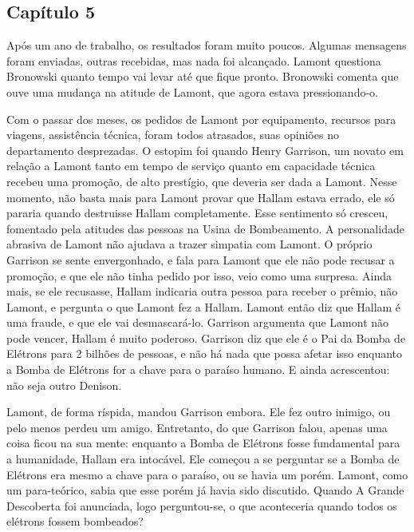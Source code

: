 \documentclass[14pt,portuguese]{extreport}
\begin{document}
	\subsection{Capítulo 5}

	  Após um ano de trabalho, os resultados foram muito poucos. Algumas mensagens foram enviadas, 
	  outras recebidas, mas nada foi alcançado. Lamont questiona Bronowski quanto tempo vai levar 
	  até que fique pronto. Bronowski comenta que ouve uma mudança na atitude de Lamont, que agora 
	  estava pressionando-o.
	
	  Com o passar dos meses, os pedidos de Lamont por equipamento, recursos para viagens, 
	  assistência técnica, foram todos atrasados, suas opiniões no departamento desprezadas. 
	  O estopim foi quando Henry Garrison, um novato em relação a Lamont tanto em tempo de serviço 
	  quanto em capacidade técnica recebeu uma promoção, de alto prestígio, que deveria ser dada a 
	  Lamont. Nesse momento, não basta mais para Lamont provar que Hallam estava errado, ele só 
	  pararia quando destruisse Hallam completamente. Esse sentimento só cresceu, fomentado pela 
	  atitudes das pessoas na Usina de Bombeamento. A personalidade abrasiva de Lamont não ajudava 
	  a trazer simpatia com Lamont. O próprio Garrison se sente envergonhado, e fala para Lamont 
	  que ele não pode recusar a promoção, e que ele não tinha pedido por isso, veio como uma 
	  surpresa. Ainda mais, se ele recusasse, Hallam indicaria outra pessoa para receber o prêmio, 
	  não Lamont, e pergunta o que Lamont fez a Hallam. Lamont então diz que Hallam é uma fraude, 
	  e que ele vai desmascará-lo. Garrison argumenta que Lamont não pode vencer, Hallam é muito 
	  poderoso. Garrison diz que ele é o Pai da Bomba de Elétrons para 2 bilhões de pessoas, e 
	  não há nada que possa afetar isso enquanto a Bomba de Elétrons for a chave para o paraíso 
	  humano. E ainda acrescentou: não seja outro Denison.
	  
	  Lamont, de forma ríspida, mandou Garrison embora. Ele fez outro inimigo, ou pelo menos perdeu 
	  um amigo. Entretanto, do que Garrison falou, apenas uma coisa ficou na sua mente: enquanto 
	  a Bomba de Elétrons fosse fundamental para a humanidade, Hallam era intocável. Ele começou a 
	  se perguntar se a Bomba de Elétrons era mesmo a chave para o paraíso, ou se havia um porém. 
	  Lamont, como um para-teórico, sabia que esse porém já havia sido discutido. Quando A Grande 
	  Descoberta foi anunciada, logo perguntou-se, o que aconteceria quando todos os elétrons 
	  fossem bombeados?
	  
\end{document}
